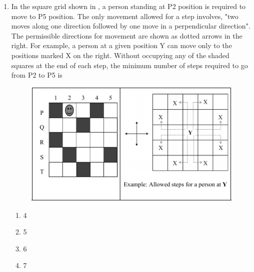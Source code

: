 \documentclass[journal,12pt,onecolumn]{IEEEtran}
\theoremstyle{remark}
\begin{document}
\begin{enumerate}
\item
In the square grid shown in , a person standing at P2 position is required to move to P5 position. The only movement allowed for a step involves, "two moves along one direction followed by one move in a perpendicular direction". The permissible directions for movement are shown as dotted arrows in the right. For example, a person at a given position Y can move only to the positions marked X on the right. Without occupying any of the shaded squares at the end of each step, the minimum number of steps required to go from P2 to P5 is
\begin{center}
    \begin{figure}[H] \caption{} \label{fig:9}\includegraphics{figs/9.png}\end{figure}%
\end{center}
\begin{enumerate}
    \item 4
    \item 5
    \item 6
    \item 7
\end{enumerate}



\end{enumerate}
\end{document}
